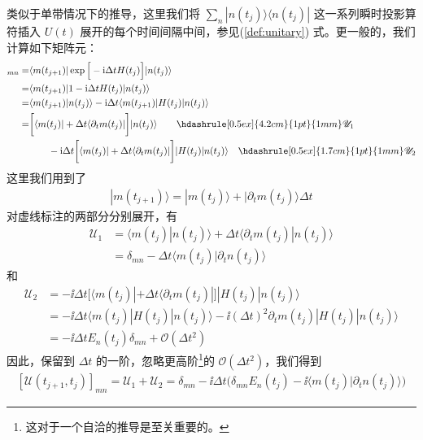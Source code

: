 类似于单带情况下的推导，这里我们将 $\sum_n|n(t_j)\rangle\langle n(t_j)|$ 这一系列瞬时投影算符插入 $U(t)$ 展开的每个时间间隔中间，参见(\ref{def:unitary}) 式。更一般的，我们计算如下矩阵元：
\begin{align}
[\mathscr{U}(t_{j+1},t_j)]_{mn}=&\langle m(t_{j+1})|\exp\Big[-\ii\Delta tH(t_j)\Big]|n(t_j)\rangle\\
=& \langle m(t_{j+1})|1-\ii\Delta tH(t_j)|n(t_j)\rangle\\
=& \langle m(t_{j+1})|n(t_j)\rangle-\ii\Delta t\langle m(t_{j+1})|H(t_j)|n(t_j)\rangle\\
=& \bigg[\langle m(t_j)|+\Delta t\langle\partial_tm(t_j)|\bigg]|n(t_j)\rangle\qquad 
\hdashrule[0.5ex]{4.2cm}{1pt}{1mm} \mathscr{U}_1\\
&\qquad-\ii\Delta t\bigg[\langle m(t_j)|+\Delta t\langle\partial_tm(t_j)|\bigg]|H(t_j)|n(t_j)\rangle \quad
\hdashrule[0.5ex]{1.7cm}{1pt}{1mm} \mathscr{U}_2
\end{align}
这里我们用到了
\begin{align}
|m(t_{j+1})\rangle=|m(t_j)\rangle+|\partial_tm(t_j)\rangle\Delta t
\end{align}
对虚线标注的两部分分别展开，有
\begin{align}
\mathscr{U}_1 &=\langle m(t_j)|n(t_j)\rangle+\Delta t\langle\partial_tm(t_j)|n(t_j)\rangle\\
&= \delta_{mn}-\Delta t\langle m(t_j)|\partial_tn(t_j)\rangle
\end{align}
和
\begin{align}
\mathscr{U}_2 &=-\ii\Delta t\bigg[\langle m(t_j)|+\Delta t\langle\partial_tm(t_j)|\bigg]|H(t_j)|n(t_j)\rangle\\
&= -\ii\Delta t\langle m(t_j)|H(t_j)|n(t_j)\rangle-\ii(\Delta t)^2\partial_tm(t_j)|H(t_j)|n(t_j)\rangle\\
&= -\ii\Delta tE_n(t_j)\delta_{mn}+\mathcal{O}(\Delta t^2)
\end{align}
因此，保留到 $\Delta t$ 的一阶，忽略更高阶\footnote{这对于一个自洽的推导是至关重要的。}的 $\mathcal{O}(\Delta t^2)$，我们得到
\begin{align}\label{eqn.umn}
[\mathscr{U}(t_{j+1},t_j)]_{mn}=\mathscr{U}_1+\mathscr{U}_2=\delta_{mn}-\ii\Delta t\bigg(\delta_{mn}E_{n}(t_j)-\ii\langle m(t_j)|\partial_tn(t_j)\rangle\bigg)
\end{align}

